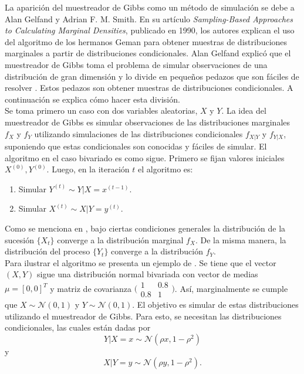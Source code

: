 \documentclass[11pt,a4paper]{article}
\begin{document}
La aparición del muestreador de Gibbs como un método de simulación se debe a Alan Gelfand y Adrian F. M. Smith. En su artículo \textit{Sampling-Based Approaches to Calculating Marginal Densities}, publicado en 1990, los autores explican el uso del algoritmo de los hermanos Geman para obtener muestras de distribuciones marginales a partir de distribuciones condicionales. Alan Gelfand explicó que el muestreador de Gibbs toma el problema de simular observaciones de una distribución de gran dimensión y lo divide en pequeños pedazos que son fáciles de resolver \citep{bertsch}. Estos pedazos son obtener muestras de distribuciones condicionales. A continuación se explica cómo hacer esta división.\\

Se toma primero un caso con dos variables aleatorias, $X$ y $Y$. La idea del muestreador de Gibbs es simular observaciones de las distribuciones marginales $f_X$ y $f_Y$ utilizando simulaciones de las distribuciones condicionales $f_{X|Y}$ y $f_{Y|X}$, suponiendo que estas condicionales son conocidas y fáciles de simular. El algoritmo en el caso bivariado es como sigue. Primero se fijan valores iniciales $X^{(0)}, Y^{(0)}$. Luego, en la iteración $t$ el algoritmo es:
\begin{enumerate}
\item Simular $Y^{(t)} \sim Y|X = x^{(t-1)}$.
\item Simular $X^{(t)} \sim X|Y = y^{(t)}$.
\end{enumerate}

Como se menciona en \citet{casella_gs}, bajo ciertas condiciones generales la distribución de la sucesión $\lbrace X_t \rbrace$ converge a la distribución marginal $f_X$. De la misma manera, la distribución del proceso $\lbrace Y_t \rbrace$ converge a la distribución $f_Y$.\\

Para ilustrar el algoritmo se presenta un ejemplo de \citet{casella}. Se tiene que el vector $(X, Y)$ sigue una distribución normal bivariada con vector de medias $\mu = [0, 0]^T$ y matriz de covarianza $\big(\begin{smallmatrix}
  1 & 0.8\\
  0.8 & 1
\end{smallmatrix}\big)$. Así, marginalmente se cumple que $X \sim \mathcal{N}(0, 1)$ y $Y \sim \mathcal{N}(0, 1)$. El objetivo es simular de estas distribuciones utilizando el muestreador de Gibbs. Para esto, se necesitan las distribuciones condicionales, las cuales están dadas por $$Y|X = x \sim \mathcal{N}(\rho x, 1 - \rho^2)$$ y $$X|Y = y \sim \mathcal{N}(\rho y, 1 - \rho^2).$$\\
\end{document}
